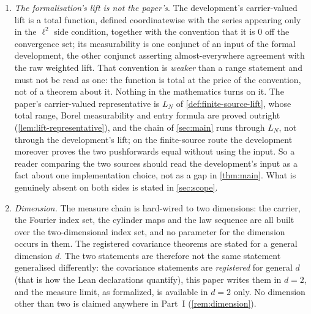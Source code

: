 \begin{enumerate}
\item \emph{The formalisation's lift is not the paper's}. The development's
  carrier-valued lift is a total function, defined coordinatewise with the
  series appearing only in the $\ell^2$ side condition, together with the
  convention that it is $0$ off the convergence set; its measurability is one
  conjunct of an input of the formal development, the other conjunct asserting
  almost-everywhere agreement with the raw weighted lift. That convention is
  \emph{weaker} than a range statement and must not be read as one: the function
  is total at the price of the convention, not of a theorem about it. Nothing in
  the mathematics turns on it. The paper's carrier-valued representative is $L_N$
  of \cref{def:finite-source-lift}, whose total range, Borel measurability and
  entry formula are proved outright (\cref{lem:lift-representative}), and the
  chain of \cref{sec:main} runs through $L_N$, not through the development's
  lift; on the finite-source route the development moreover proves the two
  pushforwards equal without using the input. So a
  reader comparing the two sources should read the development's input as a fact
  about one implementation choice, not as a gap in \cref{thm:main}. What is
  genuinely absent on both sides is stated in \cref{sec:scope}.

\item \emph{Dimension.} The measure chain is hard-wired to two dimensions: the
  carrier, the Fourier index set, the cylinder maps and the law sequence are all
  built over the two-dimensional index set, and no parameter for the dimension
  occurs in them. The registered covariance theorems are stated for a general
  dimension $d$. The two statements are therefore not the same statement
  generalised differently: the covariance statements are \emph{registered} for
  general $d$ (that is how the Lean declarations quantify), this paper writes
  them in $d=2$, and the measure limit, as formalized, is available in $d=2$
  only. No dimension other than two is claimed anywhere in Part~I
  (\cref{rem:dimension}).


\end{enumerate}
